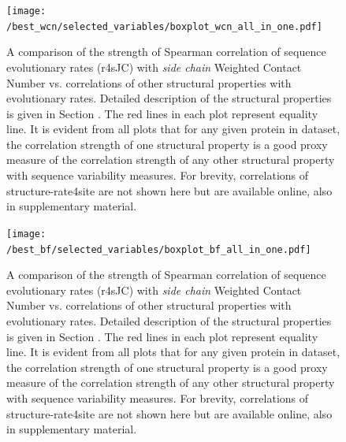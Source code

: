 \documentclass[11pt]{article}
\begin{document}
    \begin{figure}[tbh]
        \begin{center}
        \texttt{[image: /best\_wcn/selected\_variables/boxplot\_wcn\_all\_in\_one.pdf]} %
        \end{center}
        \caption{A comparison of the strength of Spearman correlation of sequence evolutionary rates (r4sJC) with {\it side chain} Weighted Contact Number vs. correlations of other structural properties with evolutionary rates. Detailed description of the structural properties is given in Section \label{sec:mam}. The red lines in each plot represent equality line. It is evident from all plots that for any given protein in dataset, the correlation strength of one structural property is a good proxy measure of the correlation strength of any other structural property with sequence variability measures. For brevity, correlations of structure-rate4site are not shown here but are available online, also in supplementary material.}
        \label{fig:best_wcn}
    \end{figure}


    \begin{figure}[tbh]
        \begin{center}
        \texttt{[image: /best\_bf/selected\_variables/boxplot\_bf\_all\_in\_one.pdf]} %
        \end{center}
        \caption{A comparison of the strength of Spearman correlation of sequence evolutionary rates (r4sJC) with {\it side chain} Weighted Contact Number vs. correlations of other structural properties with evolutionary rates. Detailed description of the structural properties is given in Section \label{sec:mam}. The red lines in each plot represent equality line. It is evident from all plots that for any given protein in dataset, the correlation strength of one structural property is a good proxy measure of the correlation strength of any other structural property with sequence variability measures. For brevity, correlations of structure-rate4site are not shown here but are available online, also in supplementary material.}
        \label{fig:best_wcn}
    \end{figure}
\end{document}
